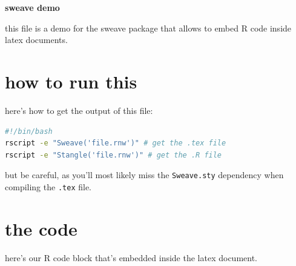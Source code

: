 \documentclass[a4paper]{article}\usepackage[]{graphicx}\usepackage[]{xcolor}
\begin{document}
\begin{center}
  \LARGE{\textbf{sweave demo}}
\end{center}

this file is a demo for the sweave package that allows to embed R code inside latex documents.

\section{how to run this}

here's how to get the output of this file:

\begin{lstlisting}[language=bash]
#!/bin/bash
rscript -e "Sweave('file.rnw')" # get the .tex file
rscript -e "Stangle('file.rnw')" # get the .R file
\end{lstlisting}

but be careful, as you'll most likely miss the \texttt{Sweave.sty} dependency when compiling the \texttt{.tex} file.

\section{the code}

here's our R code block that's embedded inside the latex document.
\end{document}
